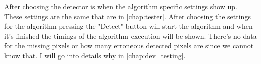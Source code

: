 After choosing the detector is when the algorithm specific settings show up. These settings are the same that are in \autoref{chap:tester}. After choosing the settings for the algorithm pressing the "Detect" button will start the algorithm and when it's finished the timings of the algorithm execution will be shown. There's no data for the missing pixels or how many erroneous detected pixels are since we cannot know that. I will go into details why in \autoref{chap:dev_testing}.
